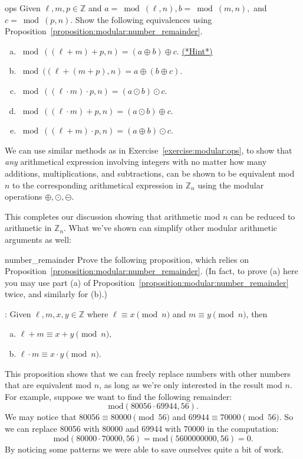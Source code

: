 \begin{exercise}{ops}
Given $\ell,m,p \in {\mathbb Z}$ and $a=\bmod(\ell,n), b=\bmod(m,n),$ and $c=\bmod(p,n)$.  Show the  following equivalences using Proposition~\ref{proposition:modular:number_remainder}.
\begin{enumerate}[(a)]
\item
$\bmod( (\ell +m) + p,n) = (a \oplus b) \oplus c$.\qquad
\hyperref[sec:modular_arithmetic:hints]{(*Hint*)}
\item
$\bmod( (\ell + (m + p),n) = a \oplus (b \oplus c)$.
\item
$\bmod( (\ell \cdot m) \cdot p,n) = (a \odot b) \odot c .$
\item
$ \bmod((\ell \cdot m) + p,n) = (a \odot b) \oplus c . $
\item
$ \bmod((\ell + m) \cdot p,n) = (a \oplus b) \odot c. $
\end{enumerate}
\end{exercise}

We can use similar methods as in Exercise~\ref{exercise:modular:ops}, to show that \emph{any} arithmetical expression involving integers with no matter how many additions, multiplications, and subtractions, can be shown to be equivalent mod $n$ to the corresponding arithmetical expression in ${\mathbb Z}_n$ using the modular operations $\oplus, \odot, \ominus$.

This completes our discussion showing that arithmetic mod $n$ can be reduced to arithmetic in ${\mathbb Z}_n$.  What we've shown can simplify other modular arithmetic arguments as well:

\begin{exercise}{number_remainder}
Prove the following proposition, which relies on Proposition~\ref{proposition:modular:number_remainder}.  (In fact, to prove (a) here you may use  part (a) of   Proposition~\ref{proposition:modular:number_remainder} twice, and similarly for (b).)

: Given $\ell,m,x,y \in {\mathbb Z}$ where $\ell \equiv x \pmod{n}$ and $m \equiv y \pmod{n}$, then 

\begin{enumerate}[(a)]
\item
$\ell + m \equiv x + y \pmod{n},$ 
\item
$\ell \cdot m \equiv x \cdot y \pmod{n}$.
\end{enumerate}
\end{exercise}

This proposition shows that we can freely replace numbers with other numbers that are equivalent mod $n$,  as long as we're only interested in the result mod $n$. For example, suppose we  want to find the following remainder:  
\[
\text{mod}(80056 \cdot 69944, 56).  
\]
We may notice that $80056 \equiv 80000 \pmod{56}$ and $69944 \equiv 70000 \pmod{56}$.  So we can replace 80056 with 80000 and 69944 with 70000 in the computation:
\[
  \text{mod}(80000 \cdot 70000, 56)= \text{mod}(5600000000, 56)=0.
\]
By noticing some patterns we were able to save ourselves quite a bit of work.

